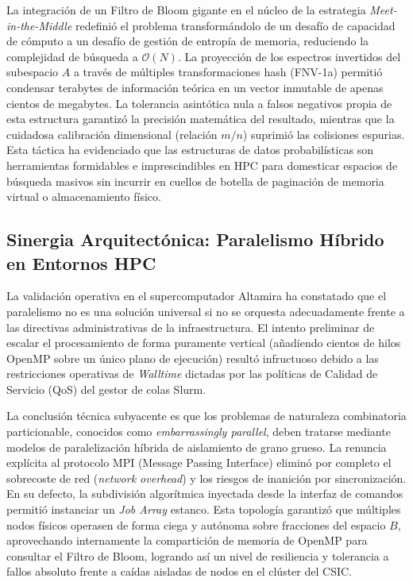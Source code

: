\documentclass[12pt,a4paper]{tfg_domingo}
\begin{document}
La integración de un Filtro de Bloom gigante en el núcleo de la estrategia \emph{Meet-in-the-Middle} redefinió el problema transformándolo de un desafío de capacidad de cómputo a un desafío de gestión de entropía de memoria, reduciendo la complejidad de búsqueda a $\mathcal{O}(N)$. La proyección de los espectros invertidos del subespacio $A$ a través de múltiples transformaciones hash (FNV-1a) permitió condensar terabytes de información teórica en un vector inmutable de apenas cientos de megabytes. La tolerancia asintótica nula a falsos negativos propia de esta estructura garantizó la precisión matemática del resultado, mientras que la cuidadosa calibración dimensional (relación $m/n$) suprimió las colisiones espurias. Esta táctica ha evidenciado que las estructuras de datos probabilísticas son herramientas formidables e imprescindibles en HPC para domesticar espacios de búsqueda masivos sin incurrir en cuellos de botella de paginación de memoria virtual o almacenamiento físico.

\subsection{Sinergia Arquitectónica: Paralelismo Híbrido en Entornos HPC}

La validación operativa en el supercomputador Altamira ha constatado que el paralelismo no es una solución universal si no se orquesta adecuadamente frente a las directivas administrativas de la infraestructura. El intento preliminar de escalar el procesamiento de forma puramente vertical (añadiendo cientos de hilos OpenMP sobre un único plano de ejecución) resultó infructuoso debido a las restricciones operativas de \emph{Walltime} dictadas por las políticas de Calidad de Servicio (QoS) del gestor de colas Slurm.

La conclusión técnica subyacente es que los problemas de naturaleza combinatoria particionable, conocidos como \emph{embarrassingly parallel}, deben tratarse mediante modelos de paralelización híbrida de aislamiento de grano grueso. La renuncia explícita al protocolo MPI (Message Passing Interface) eliminó por completo el sobrecoste de red (\emph{network overhead}) y los riesgos de inanición por sincronización. En su defecto, la subdivisión algorítmica inyectada desde la interfaz de comandos permitió instanciar un \emph{Job Array} estanco. Esta topología garantizó que múltiples nodos físicos operasen de forma ciega y autónoma sobre fracciones del espacio $B$, aprovechando internamente la compartición de memoria de OpenMP para consultar el Filtro de Bloom, logrando así un nivel de resiliencia y tolerancia a fallos absoluto frente a caídas aisladas de nodos en el clúster del CSIC.
\end{document}
